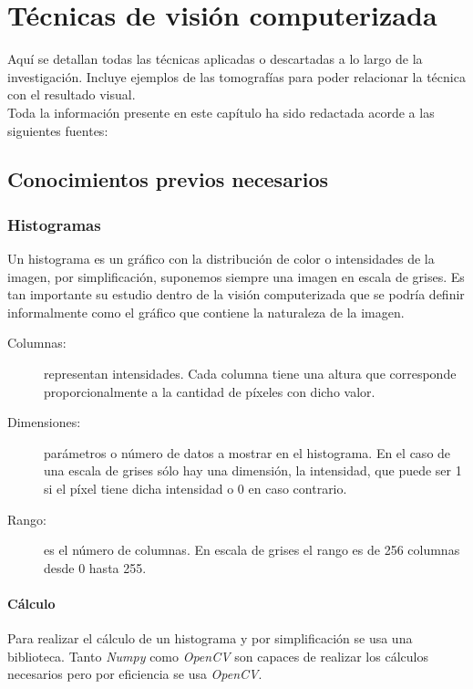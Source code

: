 \chapter{Técnicas de visión computerizada}
Aquí se detallan todas las técnicas aplicadas o descartadas a lo largo
de la investigación. Incluye ejemplos de las tomografías para poder
relacionar la técnica con el resultado visual.\\
Toda la información presente en este capítulo ha sido redactada acorde
a las siguientes fuentes:

\section{Conocimientos previos necesarios}

\subsection{Histogramas}
Un histograma es un gráfico con la distribución de color o
intensidades de la imagen, por simplificación, suponemos siempre una
imagen en escala de grises. Es tan importante su estudio dentro de la
visión computerizada que se podría definir informalmente como el
gráfico que contiene la naturaleza de la imagen.
\begin{description}
\item[Columnas:] representan intensidades. Cada columna tiene una
  altura que corresponde proporcionalmente a la cantidad de píxeles
  con dicho valor.
\item[Dimensiones:] parámetros o número de datos a mostrar en el
  histograma. En el caso de una escala de grises sólo hay una
  dimensión, la intensidad, que puede ser 1 si el píxel tiene dicha
  intensidad o 0 en caso contrario.
\item[Rango:] es el número de columnas. En escala de grises el rango
  es de 256 columnas desde 0 hasta 255.
\end{description}

\subsubsection{Cálculo}
Para realizar el cálculo de un histograma y por simplificación se usa
una biblioteca. Tanto \emph{Numpy} como \emph{OpenCV} son capaces de
realizar los cálculos necesarios pero por eficiencia se usa
\emph{OpenCV}.

